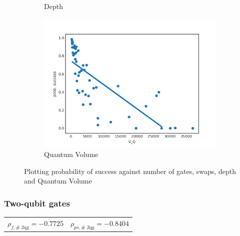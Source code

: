 \documentclass[11pt]{article}
\begin{document}
\begin{figure}[H]
\begin{subfigure}[b]{0.5\linewidth}
    \caption{Depth} 
    \label{fig:ps_d_1000} 
  \end{subfigure}%
  \begin{subfigure}[b]{0.5\linewidth}
    \centering
    \includegraphics[width=0.75\linewidth]{ps_q_1000_0_005} 
    \caption{Quantum Volume} 
    \label{fig:ps_q_1000} 
  \end{subfigure} 
  \caption{Plotting probability of success against number of gates, swaps, depth and Quantum Volume}
  \label{fig:ps_1000} 
\end{figure}

\subsubsection{Two-qubit gates}
\label{sec:orgb1b77cb}

\begin{center}
\begin{tabular}{ll}
\(\rho _{f,\text{# 2qg}} = -0.7725\) & \(\rho _{ps,\text{# 2qg}} = -0.8404\)\\
\end{tabular}
\end{center}
\end{document}
